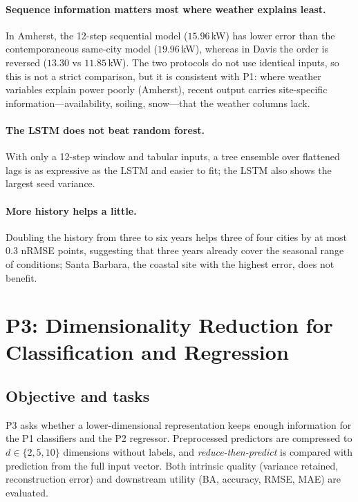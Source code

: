 \documentclass[11pt,letterpaper]{article}
\begin{document}
\paragraph{Sequence information matters most where weather explains least.} In Amherst, the
12-step sequential model ($15.96$\,kW) has lower error than the contemporaneous same-city model
($19.96$\,kW), whereas in Davis the order is reversed ($13.30$ vs $11.85$\,kW). The two protocols
do not use identical inputs, so this is not a strict comparison, but it is consistent with P1:
where weather variables explain power poorly (Amherst), recent output carries site-specific
information---availability, soiling, snow---that the weather columns lack.

\paragraph{The LSTM does not beat random forest.} With only a 12-step window and tabular inputs,
a tree ensemble over flattened lags is as expressive as the LSTM and easier to fit; the LSTM also
shows the largest seed variance.

\paragraph{More history helps a little.} Doubling the history from three to six years helps
three of four cities by at most $0.3$ nRMSE points, suggesting that three years already cover the
seasonal range of conditions; Santa Barbara, the coastal site with the highest error, does not
benefit.
\FloatBarrier

\section{P3: Dimensionality Reduction for Classification and Regression}\label{sec:p3}

\subsection{Objective and tasks}
P3 asks whether a lower-dimensional representation keeps enough information for the P1
classifiers and the P2 regressor. Preprocessed predictors are compressed to $d\in\{2,5,10\}$
dimensions without labels, and \emph{reduce-then-predict} is compared with prediction from the
full input vector. Both intrinsic quality (variance retained, reconstruction error) and downstream
utility (BA, accuracy, RMSE, MAE) are evaluated.
\end{document}
